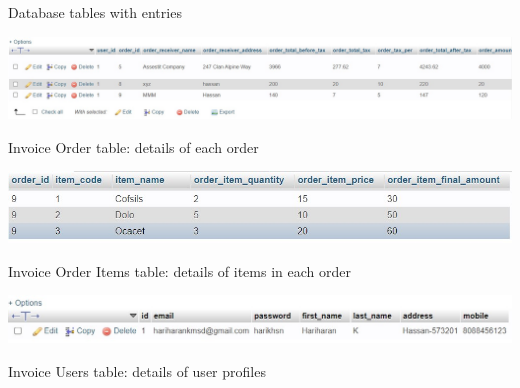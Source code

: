 Database tables with entries 
\begin{table}[h]\centering  
    \includegraphics[width=6in]{./images/invoiceorder.jpg}
	\caption{Invoice Order table: details of each order}\label{invoiceorder}
	\includegraphics[width=6in]{./images/invoiceorderitem.jpg}
	\caption{Invoice Order Items table: details of items in each order}\label{invoiceorderitem}
	\includegraphics[width=6in]{./images/invoiceuser.jpg}
	\caption{Invoice Users table: details of user profiles}\label{invoiceuser}
\end{table}

